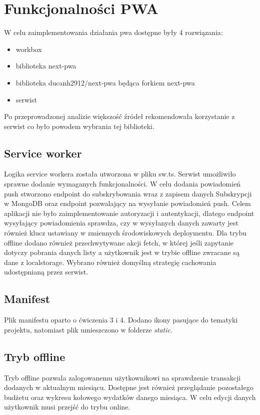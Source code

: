 \documentclass[11pt,titlepage]{article}
\begin{document}
\section{Funkcjonalności PWA}
W celu zaimplementowania działania pwa dostępne były 4 rozwiązania:
\begin{itemize}
  \item workbox
  \item biblioteka next-pwa
  \item biblioteka ducanh2912/next-pwa będąca forkiem next-pwa
  \item serwist
\end{itemize}
Po przeprowadzonej analizie większość źródeł rekomendowała korzystanie z serwist co było powodem wybrania tej biblioteki. 

\subsection{Service worker}
Logika service workera została utworzona w pliku sw.ts. Serwist umożliwiło sprawne dodanie wymaganych funkcjonalności. W celu dodania powiadomień push stworzono endpoint do subskrybowania wraz z zapisem danych Subskrypcji w MongoDB oraz endpoint pozwalający na wysyłanie powiadomień push. Celem aplikacji nie było zaimplementowanie autoryzacji i autentykacji, dlatego endpoint wysyłający powiadomienia sprawdza, czy w wysyłanych danych zawarty jest również klucz ustawiany w zmiennych środowiskowych deploymentu. Dla trybu offline dodano również przechwytywane akcji fetch, w której jeśli zapytanie dotyczy pobrania danych listy a użytkownik jest w trybie offline zwracane są dane z localstorage. Wybrano również domyślną strategię cachowania udostępnianą przez serwist.

\subsection{Manifest}
Plik manifestu oparto o ćwiczenia 3 i 4. Dodano ikony pasujące do tematyki projektu, natomiast plik umieszczono w folderze \textit{static}.

\subsection{Tryb offline}
Tryb offline pozwala zalogowanemu użytkownikowi na sprawdzenie transakcji dodanych w aktualnym miesiącu. Dostępne jest również przeglądanie pozostałego budżetu oraz wykresu kołowego wydatków danego miesiąca. W celu edycji danych użytkownik musi przejść do trybu online.
\end{document}
